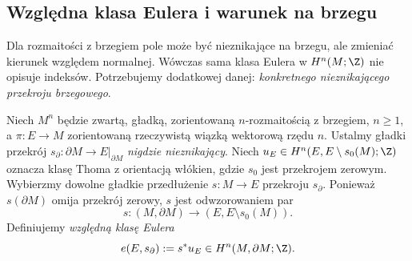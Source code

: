 \subsection*{Względna klasa Eulera i warunek na brzegu}
\label{sec:wzgledna-euler-brzeg-17}

Dla rozmaitości z brzegiem pole może być nieznikające
na brzegu, ale zmieniać kierunek względem normalnej.
Wówczas sama klasa Eulera w $H^n(M;\Z)$
nie opisuje indeksów. Potrzebujemy dodatkowej
danej: \emph{konkretnego nieznikającego przekroju brzegowego}.

\begin{definicja}
\label{def:euler-wzgledna-brzeg-17}
Niech $M^n$ będzie zwartą, gładką, zorientowaną
$n$-rozmaitością z brzegiem, $n\ge1$,
a $\pi:E\to M$ zorientowaną rzeczywistą wiązką
wektorową rzędu $n$. Ustalmy gładki przekrój
$s_{\partial}:\partial M\to E|_{\partial M}$
\emph{nigdzie nieznikający}.
Niech $u_E\in H^n(E,E\setminus s_0(M);\Z)$
oznacza klasę Thoma z orientacją włókien,
gdzie $s_0$ jest przekrojem zerowym.
Wybierzmy dowolne gładkie przedłużenie
$s:M\to E$ przekroju $s_{\partial}$.
Ponieważ $s(\partial M)$ omija przekrój zerowy,
$s$ jest odwzorowaniem par
\[
 s:(M,\partial M)\longrightarrow
       (E,E\setminus s_0(M)).
\]
Definiujemy \emph{względną klasę Eulera}
\[
 e(E,s_{\partial}):=s^*u_E\in H^n(M,\partial M;\Z).
\]
\end{definicja}

